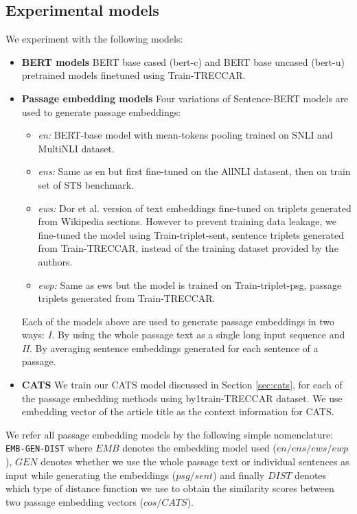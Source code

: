 \subsection{Experimental models} We experiment with the following models:
\begin{itemize}
    \item \textbf{BERT models} BERT base cased (bert-c) and BERT base uncased (bert-u) pretrained models finetuned using Train-TRECCAR.
    \item \textbf{Passage embedding models} Four variations of Sentence-BERT models are used to generate passage embeddings: 
    \begin{itemize}
        \item \textit{en:} BERT-base model with mean-tokens pooling trained on SNLI and MultiNLI dataset.
        \item \textit{ens:} Same as en but first fine-tuned on the AllNLI datasent, then on train set of STS benchmark.
        \item \textit{ews:} Dor et al. version of text embeddings fine-tuned on triplets generated from Wikipedia sections. However to prevent training data leakage, we fine-tuned the model using Train-triplet-sent, sentence triplets generated from Train-TRECCAR, instead of the training dataset provided by the authors.
        \item \textit{ewp:} Same as ews but the model is trained on Train-triplet-psg,  passage triplets generated from Train-TRECCAR.
    \end{itemize}
    Each of the models above are used to generate passage embeddings in two ways: \textit{I. } By using the whole passage text as a single long input sequence and \textit{II. } By averaging sentence embeddings generated for each sentence of a passage. 
    \item \textbf{CATS} We train our CATS model discussed in Section \ref{sec:cats}, for each of the passage embedding methods using by1train-TRECCAR dataset. We use embedding vector of the article title as the context information for CATS.
\end{itemize}

We refer all passage embedding models by the following simple nomenclature: \texttt{EMB-GEN-DIST} where $EMB$ denotes the embedding model used ($en/ens/ews/ewp$), $GEN$ denotes whether we use the whole passage text or individual sentences as input while generating the embeddings ($psg/sent$) and finally $DIST$ denotes which type of distance function we use to obtain the similarity scores between two passage embedding vectors ($cos/CATS$).

